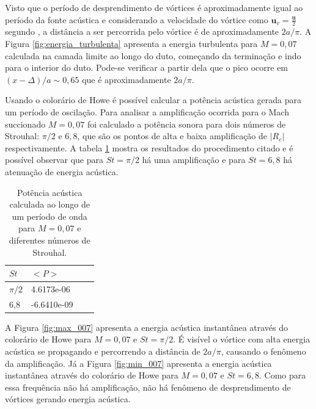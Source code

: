 \begin{figure}[ht!]
\centering
  
\end{figure}

Visto que o período de desprendimento de vórtices é aproximadamente igual ao período da fonte acústica e considerando a velocidade do vórtice como $\textbf{u}_{v} = \frac{\textbf{u}}{2}$ segundo , a distância a ser percorrida pelo vórtice é de aproximadamente $2a/\pi$. A Figura \ref{fig:energia_turbulenta} apresenta a energia turbulenta para $M = 0,07$ calculada na camada limite ao longo do duto, começando da terminação e indo para o interior do duto. Pode-se verificar a partir dela que o pico ocorre em $(x - \Delta)/a \sim 0,65$ que é aproximadamente $2a/\pi$.

\newpage
\begin{figure}[ht!]
\centering
  
\end{figure}

Usando o colorário de Howe é possível calcular a potência acústica gerada para um período de oscilação. Para analisar a amplificação ocorrida para o Mach succionado $M = 0,07$ foi calculado a potência sonora para dois números de Strouhal: $\pi/2$ e $6,8$, que são os pontos de alta e baixa amplificação de $|R_{e}|$ respectivamente. A tabela \ref{table:potencia} mostra os resultados do procedimento citado e é possível observar que para $St = \pi/2$ há uma amplificação e para $St = 6,8$ há atenuação de energia acústica. 

\begin{table}[ht!]
\centering
\caption{Potência acústica calculada ao longo de um período de onda para $M = 0,07$ e diferentes números de Strouhal.}
\label{table:potencia}
    \begin{tabular}{|l|l|l|l|}
        \hline
        $St$ & $<P>$ \\ \hline
        $\pi/2$ & 4.6173e-06  \\ \hline  
        6,8 & -6.6410e-09 \\ \hline
    \end{tabular}
\end{table} 


A Figura \ref{fig:max_007} apresenta a energia acústica instantânea através do colorário de Howe para $M = 0,07$ e $St = \pi/2$. É visível o vórtice com alta energia acústica se propagando e percorrendo a distância de $2a/\pi$, causando o fenômeno da amplificação. Já a Figura \ref{fig:min_007} apresenta a energia acústica instantânea através do colorário de Howe para $M = 0,07$ e $St = 6,8$. Como para essa frequência não há amplificação, não há fenômeno de desprendimento de vórtices gerando energia acústica.   

